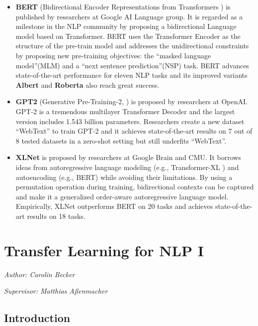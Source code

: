 \documentclass[]{krantz}
\begin{document}
\begin{itemize}
\item
  \textbf{BERT} (Bidirectional Encoder Representations from Transformers \citet{bert}) is published by researchers at Google AI Language group.
  It is regarded as a milestone in the NLP community by proposing a bidirectional Language model based on Transformer. BERT uses the Transformer Encoder as the structure of the pre-train model and addresses the unidirectional constraints by proposing new pre-training objectives: the ``masked language model''(MLM) and a ``next sentence prediction''(NSP) task. BERT advances state-of-the-art performance for eleven NLP tasks and its improved variants \textbf{Albert} \citet{lan2019albert} and \textbf{Roberta} \citet{liu2019roberta} also reach great success.
\item
  \textbf{GPT2} (Generative Pre-Training-2, \citet{radford2019gpt2}) is proposed by researchers at OpenAI. GPT-2 is a tremendous multilayer Transformer Decoder and the largest version includes 1.543 billion parameters. Researchers create a new dataset ``WebText'' to train GPT-2 and it achieves state-of-the-art results on 7 out of 8 tested datasets in a zero-shot setting but still underfits ``WebText''.
\item
  \textbf{XLNet} is proposed by researchers at Google Brain and CMU\citep{yang2019xlnet}. It borrows ideas from autoregressive language modeling (e.g., Transformer-XL \citet{dai2019transformer}) and autoencoding (e.g., BERT) while avoiding their limitations. By using a permutation operation during training, bidirectional contexts can be captured and make it a generalized order-aware autoregressive language model. Empirically, XLNet outperforms BERT on 20 tasks and achieves state-of-the-art results on 18 tasks.
\end{itemize}

\hypertarget{transfer-learning-for-nlp-i}{%
\chapter{Transfer Learning for NLP I}\label{transfer-learning-for-nlp-i}}

\emph{Author: Carolin Becker}

\emph{Supervisor: Matthias Aßenmacher}

\hypertarget{introduction-1}{%
\section{Introduction}\label{introduction-1}}
\end{document}
